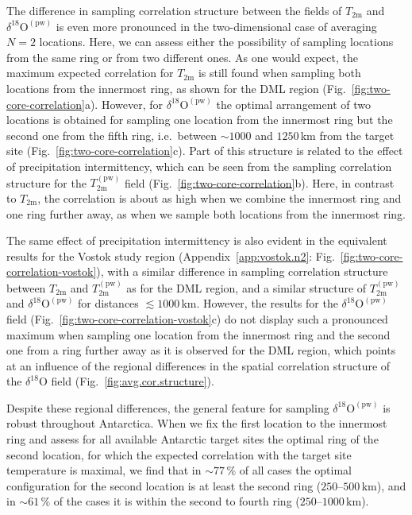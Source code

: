 \documentclass[cp, manuscript]{copernicus}
\begin{document}
The difference in sampling correlation structure between the fields of
$T_{\mathrm{2m}}$ and $\delta^{18}\mathrm{O}^{\mathrm{(pw)}}$ is even more
pronounced in the two-dimensional case of averaging $N=2$ locations. Here, we
can assess either the possibility of sampling locations from the same ring or
from two different ones. As one would expect, the maximum expected correlation
for $T_{\mathrm{2m}}$ is still found when sampling both locations from the
innermost ring, as shown for the DML region
(Fig.~\ref{fig:two-core-correlation}a). However, for
$\delta^{18}\mathrm{O}^{\mathrm{(pw)}}$ the optimal arrangement of two locations
is obtained for sampling one location from the innermost ring but the second
one from the fifth ring, i.e.\ between $\sim1000$ and $1250$\,km from the target
site (Fig.~\ref{fig:two-core-correlation}c). Part of this structure is related
to the effect of precipitation intermittency, which can be seen from the
sampling correlation structure for the $T_{\mathrm{2m}}^{\mathrm{(pw)}}$ field
(Fig.~\ref{fig:two-core-correlation}b). Here, in contrast to $T_{\mathrm{2m}}$,
the correlation is about as high when we combine the innermost ring and one ring
further away, as when we sample both locations from the innermost ring.

The same effect of precipitation intermittency is also evident in the equivalent
results for the Vostok study region (Appendix~\ref{app:vostok.n2}:
Fig.~\ref{fig:two-core-correlation-vostok}), with a similar difference in
sampling correlation structure between $T_{\mathrm{2m}}$ and
$T_{\mathrm{2m}}^{\mathrm{(pw)}}$ as for the DML region, and a similar structure
of $T_{\mathrm{2m}}^{\mathrm{(pw)}}$ and
$\delta^{18}\mathrm{O}^{\mathrm{(pw)}}$ for distances $\lesssim1000$\,km.
However, the results for the $\delta^{18}\mathrm{O}^{\mathrm{(pw)}}$ field
(Fig.~\ref{fig:two-core-correlation-vostok}c) do not display such a pronounced
maximum when sampling one location from the innermost ring and the second one
from a ring further away as it is observed for the DML region, which points at
an influence of the regional differences in the spatial correlation structure of
the $\delta^{18}\mathrm{O}$ field (Fig.~\ref{fig:avg.cor.structure}).

Despite these regional differences, the general feature for sampling
$\delta^{18}\mathrm{O}^{\mathrm{(pw)}}$ is robust throughout Antarctica. When we
fix the first location to the innermost ring and assess for all available
Antarctic target sites the optimal ring of the second location, for which the
expected correlation with the target site temperature is maximal, we find that
in $\sim77\,\%$ of all cases the optimal configuration for the second location
is at least the second ring ($250$--$500$\,km), and in $\sim61\,\%$ of the cases
it is within the second to fourth ring ($250$--$1000$\,km).
\end{document}
